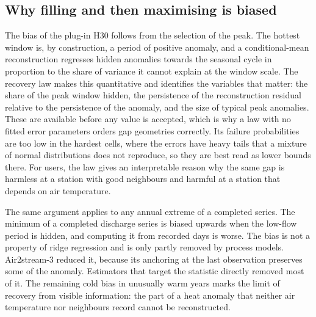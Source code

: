 \documentclass[draft]{agujournal2025}
\begin{document}
\subsection{Why filling and then maximising is biased}
The bias of the plug-in H30 follows from the selection of the peak. The hottest window is, by construction, a period of positive anomaly, and a conditional-mean reconstruction regresses hidden anomalies towards the seasonal cycle in proportion to the share of variance it cannot explain at the window scale. The recovery law makes this quantitative and identifies the variables that matter: the share of the peak window hidden, the persistence of the reconstruction residual relative to the persistence of the anomaly, and the size of typical peak anomalies. These are available before any value is accepted, which is why a law with no fitted error parameters orders gap geometries correctly. Its failure probabilities are too low in the hardest cells, where the errors have heavy tails that a mixture of normal distributions does not reproduce, so they are best read as lower bounds there. For users, the law gives an interpretable reason why the same gap is harmless at a station with good neighbours and harmful at a station that depends on air temperature.

The same argument applies to any annual extreme of a completed series. The minimum of a completed discharge series is biased upwards when the low-flow period is hidden, and computing it from recorded days is worse. The bias is not a property of ridge regression and is only partly removed by process models. Air2stream-3 reduced it, because its anchoring at the last observation preserves some of the anomaly. Estimators that target the statistic directly removed most of it. The remaining cold bias in unusually warm years marks the limit of recovery from visible information: the part of a heat anomaly that neither air temperature nor neighbours record cannot be reconstructed.
\end{document}
